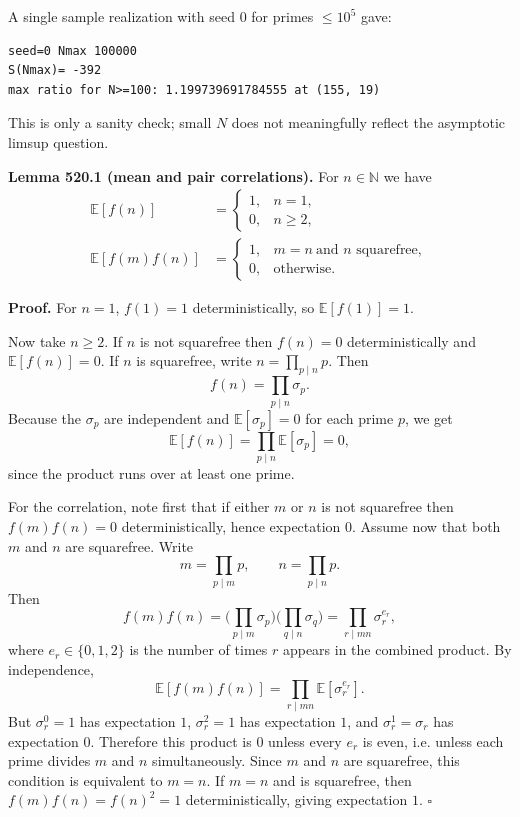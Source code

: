 A single sample realization with seed $0$ for primes $\le 10^5$ gave:
\begin{verbatim}
seed=0 Nmax 100000
S(Nmax)= -392
max ratio for N>=100: 1.199739691784555 at (155, 19)
\end{verbatim}
This is only a sanity check; small $N$ does not meaningfully reflect the asymptotic limsup question.

\medskip
\noindent\textbf{Lemma 520.1 (mean and pair correlations).}
For $n\in\mathbb N$ we have
\begin{align*}
\mathbb E[f(n)] &= \begin{cases}1,& n=1,\\0,& n\ge 2,\end{cases}\\
\mathbb E[f(m)f(n)] &= \begin{cases}1,& m=n\ \text{and $n$ squarefree},\\0,& \text{otherwise}.
\end{cases}
\end{align*}

\noindent\textbf{Proof.}
For $n=1$, $f(1)=1$ deterministically, so $\mathbb E[f(1)]=1$.

Now take $n\ge 2$. If $n$ is not squarefree then $f(n)=0$ deterministically and $\mathbb E[f(n)]=0$. If $n$ is squarefree, write $n=\prod_{p\mid n}p$. Then
\[f(n)=\prod_{p\mid n}\sigma_p.\]
Because the $\sigma_p$ are independent and $\mathbb E[\sigma_p]=0$ for each prime $p$, we get
\[\mathbb E[f(n)] = \prod_{p\mid n} \mathbb E[\sigma_p] = 0,\]
since the product runs over at least one prime.

For the correlation, note first that if either $m$ or $n$ is not squarefree then $f(m)f(n)=0$ deterministically, hence expectation $0$.
Assume now that both $m$ and $n$ are squarefree. Write
\[m=\prod_{p\mid m} p,\qquad n=\prod_{p\mid n} p.\]
Then
\[f(m)f(n)=\Big(\prod_{p\mid m}\sigma_p\Big)\Big(\prod_{q\mid n}\sigma_q\Big)=\prod_{r\mid mn} \sigma_r^{e_r},\]
where $e_r\in\{0,1,2\}$ is the number of times $r$ appears in the combined product. By independence,
\[\mathbb E[f(m)f(n)] = \prod_{r\mid mn} \mathbb E[\sigma_r^{e_r}].\]
But $\sigma_r^{0}=1$ has expectation $1$, $\sigma_r^{2}=1$ has expectation $1$, and $\sigma_r^{1}=\sigma_r$ has expectation $0$. Therefore this product is $0$ unless every $e_r$ is even, i.e. unless each prime divides $m$ and $n$ simultaneously. Since $m$ and $n$ are squarefree, this condition is equivalent to $m=n$.
If $m=n$ and is squarefree, then $f(m)f(n)=f(n)^2=1$ deterministically, giving expectation $1$.
\hfill$\square$

